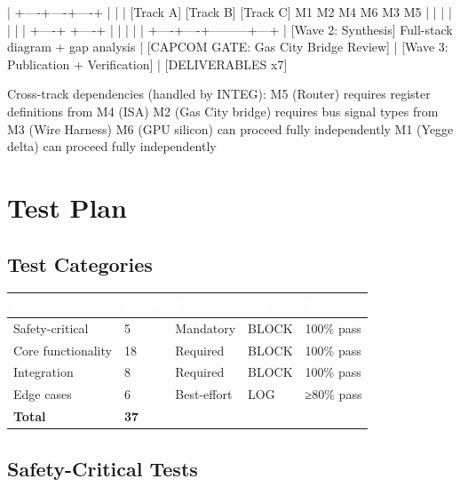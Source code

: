 \documentclass[11pt,letterpaper]{article}
\newcommand{\tableheader}[1]{\textbf{\sffamily\textcolor{white}{#1}}}
\begin{document}
\begin{asciibox}
        |
   +----+----+----+
   |    |         |
[Track A]  [Track B]  [Track C]
 M1  M2    M4  M6    M3  M5
   |    |    |    |    |    |
   |    +----+    +----+    |
   |         |         |   |
   +----+----+---------+---+
        |
   [Wave 2: Synthesis]
   Full-stack diagram + gap analysis
        |
   [CAPCOM GATE: Gas City Bridge Review]
        |
   [Wave 3: Publication + Verification]
        |
   [DELIVERABLES x7]

Cross-track dependencies (handled by INTEG):
  M5 (Router) requires register definitions from M4 (ISA)
  M2 (Gas City bridge) requires bus signal types from M3 (Wire Harness)
  M6 (GPU silicon) can proceed fully independently
  M1 (Yegge delta) can proceed fully independently
\end{asciibox}

\section{Test Plan}

\subsection{Test Categories}

\begin{center}
\begin{tabularx}{\textwidth}{L{3.5cm}C{1.5cm}C{2cm}C{2cm}X}
\toprule
{}
\tableheader{Category} & \tableheader{Count} & \tableheader{Priority} & \tableheader{Failure} & \tableheader{Target} \\
\midrule
Safety-critical & 5 & Mandatory & BLOCK & 100\% pass \\
Core functionality & 18 & Required & BLOCK & 100\% pass \\
Integration & 8 & Required & BLOCK & 100\% pass \\
Edge cases & 6 & Best-effort & LOG & ≥80\% pass \\
\midrule
\textbf{Total} & \textbf{37} & & & \\
\bottomrule
\end{tabularx}
\end{center}

\subsection{Safety-Critical Tests}
\end{document}
